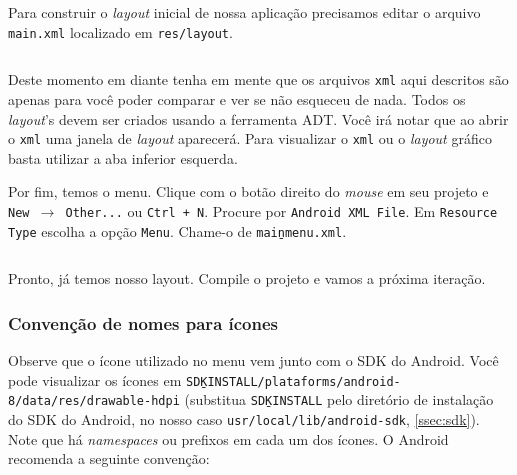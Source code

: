 Para construir o \textit{layout} inicial de nossa aplicação precisamos editar o arquivo \texttt{main.xml}
localizado em \texttt{res/layout}.

\begin{listing}[H]
  \inputminted[linenos=true,frame=bottomline,tabsize=3]{ xml }{ source/main-1.xml }
  \caption{Layout principal [res/layout/main.xml]}
\end{listing}

Deste momento em diante tenha em mente que os arquivos \texttt{\gls{xml}} aqui descritos são apenas para
você poder comparar e ver se não esqueceu de nada. Todos os \textit{layout}'s devem ser criados usando a
ferramenta ADT. Você irá notar que ao abrir o \texttt{xml} uma janela de \textit{layout} aparecerá.
Para visualizar o \texttt{xml} ou o \textit{layout} gráfico basta utilizar a aba inferior esquerda.

Por fim, temos o menu. Clique com o botão direito do \textit{mouse} em seu projeto e \texttt{New
$\rightarrow$ Other...} ou \texttt{Ctrl + N}. Procure por \texttt{Android XML File}. Em \texttt{Resource
Type} escolha a opção \texttt{Menu}. Chame-o de \texttt{main\b{ }menu.xml}.

\begin{listing}[H]
  \inputminted[linenos=true,frame=bottomline,tabsize=3]{ xml }{ source/main_menu-1.xml }
  \caption{Menu principal [res/menu/main\b{ }menu.xml]}
\end{listing}

Pronto, já temos nosso layout. Compile o projeto e vamos a próxima iteração.

\subsubsection{Convenção de nomes para ícones\label{sssec:nomeicones}}

Observe que o ícone utilizado no menu vem junto com o SDK do Android. Você pode visualizar os
ícones em \texttt{SDK\b{ }INSTALL/plataforms/android-8/data/res/drawable-hdpi}
(substitua \texttt{SDK\b{ }INSTALL} pelo diretório de instalação do SDK do Android, no nosso caso
\texttt{usr/local/lib/android-sdk}, \ref{ssec:sdk}). Note que há \textit{namespaces} ou prefixos em
cada um dos ícones. O Android recomenda a seguinte convenção:

